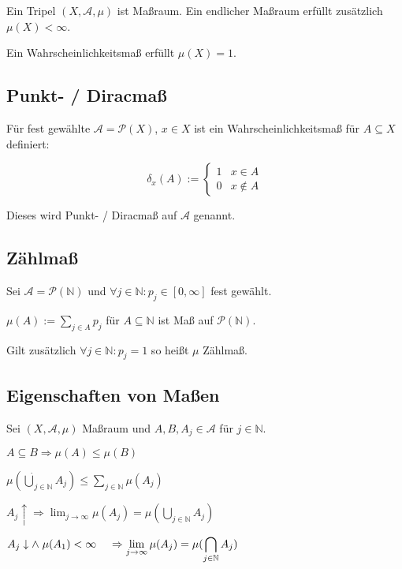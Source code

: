 Ein Tripel $(X, \mathcal{A}, \mu)$ ist Maßraum. Ein endlicher Maßraum erfüllt zusätzlich $\mu(X) < \infty$.

Ein Wahrscheinlichkeitsmaß erfüllt $\mu(X) = 1$.

\subsection*{Punkt- / Diracmaß}

Für fest gewählte $\mathcal{A} = \mathcal{P}(X)$, $x \in X$ ist ein Wahrscheinlichkeitsmaß für $A \subseteq X$ definiert:

$$\delta_x(A) := \begin{cases}
	1 & x \in A \\
	0 & x \notin A
\end{cases}$$

Dieses wird Punkt- / Diracmaß auf $\mathcal{A}$ genannt.

\subsection*{Zählmaß}

Sei $\mathcal{A} = \mathcal{P}(\mathbb{N})$ und $\forall j \in \mathbb{N} : p_j \in [0, \infty]$ fest gewählt.

$\mu(A) := \sum_{j\in A} p_j$ für $A \subseteq \mathbb{N}$ ist Maß auf $\mathcal{P}(\mathbb{N})$.

Gilt zusätzlich $\forall j \in \mathbb{N} : p_j = 1$ so heißt $\mu$ Zählmaß.

\subsection*{Eigenschaften von Maßen}

Sei $(X, \mathcal{A}, \mu)$ Maßraum und $A, B, A_j \in \mathcal{A}$ für $j \in \mathbb{N}$.

\begin{description}[leftmargin=!,labelwidth=26mm]
	\item[Monotonie] $A \subseteq B \Rightarrow \mu(A) \leq \mu(B)$
	\item[$\sigma$-Subadditivität] $\mu(\dot\bigcup_{j\in \mathbb{N}} A_j) \leq \sum_{j\in \mathbb{N}} \mu(A_j)$
	\item[Stetigkeit (unten)] $A_j \uparrow \Rightarrow \displaystyle\lim_{j\to \infty} \mu(A_j) = \mu(\bigcup_{j\in \mathbb{N}} A_j)$
	\item[Stetigkeit (oben)] $A_j \downarrow \land \hspace*{1mm} \mu(A_1) < \infty \\ \hspace*{4mm}\Rightarrow \displaystyle\lim_{j\to \infty} \mu(A_j) = \mu(\bigcap_{j\in \mathbb{N}} A_j)$
\end{description}


